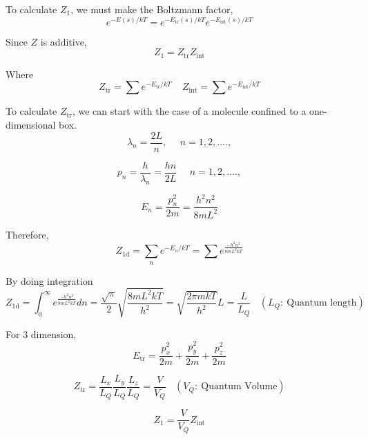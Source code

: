 To calculate $Z_1$, we must make the Boltzmann factor,
\begin{equation}
e^{-E(s)/kT} = e^{-E_\text{tr}(s)/kT}  e^{-E_\text{int}(s)/kT}
\end{equation}

Since $Z$ is additive,
\begin{equation}
Z_1 = Z_\text{tr}Z_\text{int}
\end{equation}

Where
\begin{equation}
 Z_\text{tr} = \sum e^{-E_\text{tr}/kT}  ~~~~~   Z_\text{int} = \sum e^{-E_\text{int}/kT}
\end{equation}

To calculate $Z_\text{tr}$, we can start with the case of a molecule confined to a one-dimensional box.
\begin{equation}
\lambda_n = \frac{2L}{n},    ~~~~~~ n = 1,2,....,
\end{equation}

\begin{equation}
p_n = \frac{h}{\lambda_n}=\frac{hn}{2L}    ~~~~~~ n = 1,2,....,
\end{equation}

\begin{equation}
E_n = \frac{p_n^2}{2m}=\frac{h^2n^2}{8mL^2}   
\end{equation}

Therefore, 
\begin{equation}
Z_\text{1d} = \sum_n e^{-E_n/kT} = \sum e^{\frac{-h^2n^2}{8mL^2kT}}
\end{equation}

By doing integration
\begin{equation}
Z_\text{1d} = \int_0^{\infty}  e^{\frac{-h^2n^2}{8mL^2kT}} dn 
            = \frac{\sqrt{\pi}}{2} \sqrt{\frac{8mL^2kT}{h^2}} 
            = \sqrt{\frac{2\pi mkT}{h^2}}L
            = \frac{L}{L_Q}  ~~~~ (L_Q: ~\text{Quantum length})
\end{equation}

For 3 dimension, 
\begin{equation}
E_\text{tr} = \frac{p_x^2}{2m} + \frac{p_y^2}{2m} + \frac{p_z^2}{2m}
\end{equation}

\begin{equation}
Z_\text{tr} = \frac{L_x}{L_Q} \frac{L_y}{L_Q} \frac{L_z}{L_Q} = \frac{V}{V_Q} ~~~~ (V_Q: ~\text{Quantum Volume})
\end{equation}

\begin{equation}
Z_{1} = \frac{V}{V_Q} Z_\text{int}
\end{equation}

